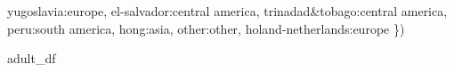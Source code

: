 \documentclass[
  letterpaper,
  DIV=11,
  numbers=noendperiod]{scrartcl}
\newenvironment{Shaded}{\begin{snugshade}}{\end{snugshade}}
\newcommand{\NormalTok}[1]{\textcolor[rgb]{0.00,0.23,0.31}{#1}}
\newcommand{\StringTok}[1]{\textcolor[rgb]{0.13,0.47,0.30}{#1}}
\begin{document}
\begin{Shaded}
\begin{Highlighting}[]
    \StringTok{\textquotesingle{}yugoslavia\textquotesingle{}}\NormalTok{:}\StringTok{\textquotesingle{}europe\textquotesingle{}}\NormalTok{,}
    \StringTok{\textquotesingle{}el{-}salvador\textquotesingle{}}\NormalTok{:}\StringTok{\textquotesingle{}central america\textquotesingle{}}\NormalTok{,}
    \StringTok{\textquotesingle{}trinadad\&tobago\textquotesingle{}}\NormalTok{:}\StringTok{\textquotesingle{}central america\textquotesingle{}}\NormalTok{,}
    \StringTok{\textquotesingle{}peru\textquotesingle{}}\NormalTok{:}\StringTok{\textquotesingle{}south america\textquotesingle{}}\NormalTok{,}
    \StringTok{\textquotesingle{}hong\textquotesingle{}}\NormalTok{:}\StringTok{\textquotesingle{}asia\textquotesingle{}}\NormalTok{,}
    \StringTok{\textquotesingle{}other\textquotesingle{}}\NormalTok{:}\StringTok{\textquotesingle{}other\textquotesingle{}}\NormalTok{, }
    \StringTok{\textquotesingle{}holand{-}netherlands\textquotesingle{}}\NormalTok{:}\StringTok{\textquotesingle{}europe\textquotesingle{}}
\NormalTok{\})}

\NormalTok{adult\_df}
\end{Highlighting}
\end{Shaded}
\end{document}
